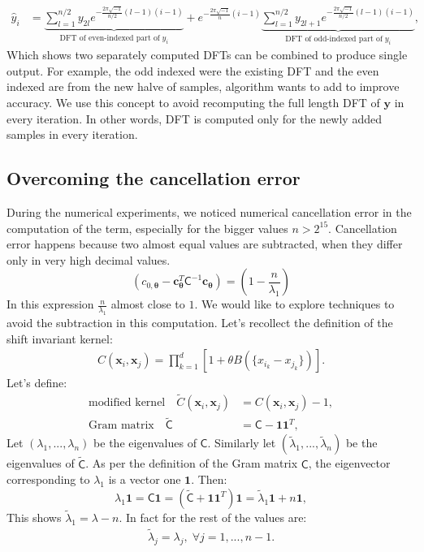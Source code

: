 \documentclass[twocolumn]{svjour3}          %
\newcommand{\bm}[1]{\boldsymbol{#1}}
\newcommand{\vtheta}{{\bm{\theta}}}
\newcommand{\vc}{\bm{c}}
\newcommand{\vx}{\bm{x}}
\newcommand{\vy}{\bm{y}}
\newcommand{\vone}{\bm{1}}
\newcommand{\mC}{\mathsf{C}}
\newcommand{\mCInv}{{\mathsf{C}^{-1}}}
\newcommand{\tmC}{\widetilde{\mathsf{C}}}
\newcommand{\tlambda}{\tilde{\lambda}}
\begin{document}
\begin{align*}
\hat{y}_i &=  
\underbrace{
\sum_{l=1}^{n/2} y_{2l} 
e^{- \frac{2\pi \sqrt{-1}}{n/2} (l-1)( i-1) }
}_{\text{DFT of even-indexed part of}\; y_i}
+
e^{- \frac{2\pi \sqrt{-1}}{n} (i-1) }
\underbrace{
\sum_{l=1}^{n/2} y_{2l+1} 
e^{- \frac{2\pi \sqrt{-1}}{n/2} (l-1)( i-1) }
}_{\text{DFT of odd-indexed part of}\; y_i},
\end{align*}
Which shows two separately computed DFTs can be combined to produce single output. For example, the odd indexed were the existing DFT and the even indexed are from the new halve of samples, algorithm wants to add to improve accuracy.
We use this concept to avoid recomputing the full length DFT of $\vy$ in every iteration. In other words, DFT is computed only for the newly added samples in every iteration.















\subsection{Overcoming the cancellation error}
During the numerical experiments, we noticed numerical cancellation error in the computation of the term, especially for the bigger values $n > 2^{15}$. Cancellation error happens because two almost equal values are subtracted, when they differ only in very high decimal values. 
\[
\left(c_{0,\vtheta} - {\vc}_{\vtheta}^T\mCInv\vc_{\vtheta} \right) = 
\left(
1 - \frac{n }{\lambda_1} \right)
\]
In this expression $\frac{n}{\lambda_1}$ almost close to $1$.
We would like to explore techniques to avoid the subtraction in this computation.
Let's recollect the definition of the shift invariant kernel:
\begin{align*}
C(\vx_i, \vx_j) = \prod_{k=1}^d \left[1 + \theta B(\{x_{i_k} - x_{j_k}\}) \right].
\end{align*}
Let's define:
\begin{align*}
\text{modified kernel} \quad \widetilde{C}(\vx_i, \vx_j) &= C(\vx_i, \vx_j) - 1,
\\
\text{Gram matrix} \quad \tmC &= \mC - \vone \vone^T,
\end{align*}
Let $(\lambda_1, ..., \lambda_n)$ be the eigenvalues of $\mC$. Similarly let $(\tlambda_1, ..., \tlambda_n)$ be the eigenvalues of $\tmC$. As per the definition of the Gram matrix $\mC$, the eigenvector corresponding to $\lambda_1$ is a vector one $\vone$. 
Then:
\begin{equation}
\nonumber
\lambda_1 \vone  = \mC \vone 
 = (\tmC + \vone \vone^T) \vone
 = \tlambda_1 \vone + n \vone,
\end{equation}
This shows $\tlambda_1 = \lambda - n$. In fact for the rest of the values are:
\begin{align}
\label{eqn:lambda_to_tlambda_relation}
\tlambda_j = \lambda_j, \; \forall j=1,...,n-1.
\end{align}
\end{document}
